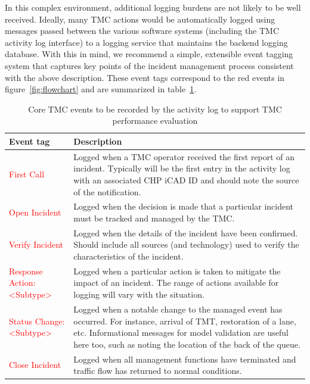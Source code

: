 \documentclass[12pt]{report}
\begin{document}
In this complex environment, additional logging burdens are not likely to be
well received.  Ideally, many \ac{TMC} actions would be automatically logged using
messages passed between the various software systems (including the \ac{TMC} activity
log interface) to a logging service that maintains the backend logging database.
With this in mind, we recommend a simple, extensible event tagging system that
captures key points of the incident management process consistent with the above
description.  These event tags correspond to the red events in
figure~\ref{fig:flowchart} and are summarized in
table~\ref{tab:tmc-event-summary}.
\begin{table}[ht]
  \centering
 \footnotesize
\begin{tabularx}{\textwidth}{lX}
  \hline
  \textbf{Event tag} & \textbf{Description}\\
  \hline {\sc \textcolor{red}{First Call}} & Logged when a \ac{TMC}
  operator received the first report of an incident.  Typically will
  be the first entry in the activity log with an associated \ac{CHP}
  \ac{iCAD} ID
  and should note the source of the notification.  \\
  {\sc \textcolor{red}{Open Incident}} & Logged when the decision is
  made that a particular incident must be tracked and
  managed by the \ac{TMC}.\\
  {\sc \textcolor{red}{Verify Incident}} & Logged when the details of
  the incident have been confirmed.  Should include all sources (and
  technology) used to verify the characteristics of the incident.  \\
  {\sc \textcolor{red}{Response Action:<Subtype>}} & Logged when a
  particular action is taken to mitigate the impact of an incident.
  The range of actions available for logging will vary with the
  situation.\\
  {\sc \textcolor{red}{Status Change:<Subtype>}} & Logged when a
  notable change to the managed event has occurred.  For instance,
  arrival of \ac{TMT}, restoration of a lane, etc.  Informational
  messages for model validation are useful here too, such as noting
  the
  location of the back of the queue.\\
  {\sc \textcolor{red}{Close Incident}} & Logged when all management
  functions have terminated and traffic flow has returned to normal
  conditions. \\
  \hline
\end{tabularx}
  \caption{Core TMC events to be recorded by the activity log to support TMC performance evaluation}
  \label{tab:tmc-event-summary}
\end{table}
\end{document}

